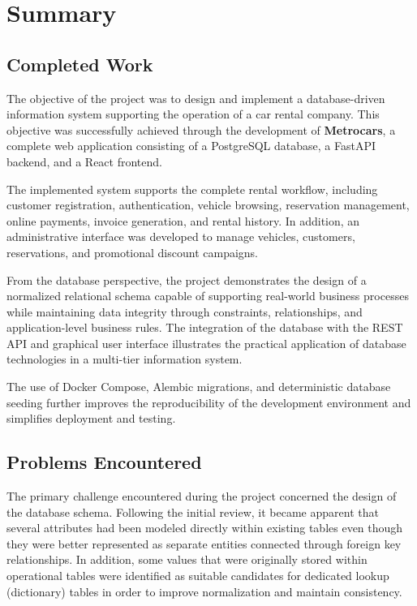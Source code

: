 \section{Summary}

\subsection{Completed Work}

The objective of the project was to design and implement a database-driven information system supporting the operation of a car rental company. This objective was successfully achieved through the development of \textbf{Metrocars}, a complete web application consisting of a PostgreSQL database, a FastAPI backend, and a React frontend.

The implemented system supports the complete rental workflow, including customer registration, authentication, vehicle browsing, reservation management, online payments, invoice generation, and rental history. In addition, an administrative interface was developed to manage vehicles, customers, reservations, and promotional discount campaigns.

From the database perspective, the project demonstrates the design of a normalized relational schema capable of supporting real-world business processes while maintaining data integrity through constraints, relationships, and application-level business rules. The integration of the database with the REST API and graphical user interface illustrates the practical application of database technologies in a multi-tier information system.

The use of Docker Compose, Alembic migrations, and deterministic database seeding further improves the reproducibility of the development environment and simplifies deployment and testing.

\subsection{Problems Encountered}

The primary challenge encountered during the project concerned the design of the database schema. Following the initial review, it became apparent that several attributes had been modeled directly within existing tables even though they were better represented as separate entities connected through foreign key relationships. In addition, some values that were originally stored within operational tables were identified as suitable candidates for dedicated lookup (dictionary) tables in order to improve normalization and maintain consistency.

